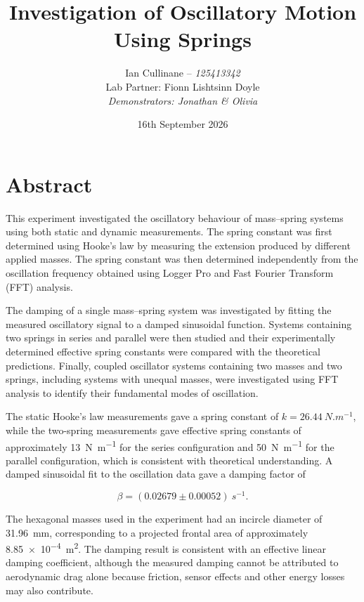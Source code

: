 \documentclass[12pt,a4paper]{article}
\title{\Large\textbf{Investigation of Oscillatory Motion Using Springs}}
\author{
Ian Cullinane – \textit{125413342} \\
Lab Partner: Fionn Lishtsinn Doyle \\[0.5em]
\textit{Demonstrators: Jonathan \& Olivia}
}
\date{16th September 2026}
\begin{document}
\maketitle
\newpage
\tableofcontents
\newpage

\section{Abstract}

This experiment investigated the oscillatory behaviour of mass--spring systems using both static and dynamic measurements. The spring constant was first determined using Hooke's law by measuring the extension produced by different applied masses. The spring constant was then determined independently from the oscillation frequency obtained using Logger Pro and Fast Fourier Transform (FFT) analysis.

The damping of a single mass--spring system was investigated by fitting the measured oscillatory signal to a damped sinusoidal function. Systems containing two springs in series and parallel were then studied and their experimentally determined effective spring constants were compared with the theoretical predictions. Finally, coupled oscillator systems containing two masses and two springs, including systems with unequal masses, were investigated using FFT analysis to identify their fundamental modes of oscillation.

The static Hooke's law measurements gave a spring constant of 
$k = \SI{26.44}{N.m^{-1}}$, while the two-spring measurements gave effective spring constants of approximately \SI{13}{N.m^{-1}} for the series configuration and \SI{50}{N.m^{-1}} for the parallel configuration, which is consistent with theoretical understanding. A damped sinusoidal fit to the oscillation data gave a damping factor of

\begin{equation}
\beta=(0.02679\pm0.00052)\ \si{s^{-1}}.
\end{equation}

The hexagonal masses used in the experiment had an incircle diameter of \SI{31.96}{mm}, corresponding to a projected frontal area of approximately \SI{8.85e-4}{m^2}. The damping result is consistent with an effective linear damping coefficient, although the measured damping cannot be attributed to aerodynamic drag alone because friction, sensor effects and other energy losses may also contribute.

\newpage
\end{document}
